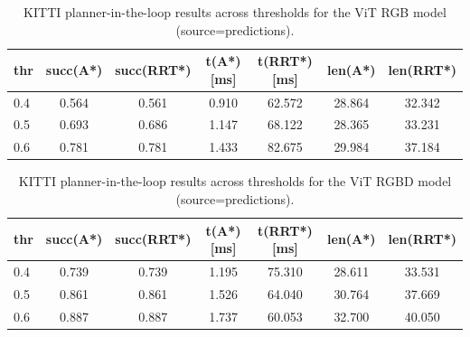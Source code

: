 \begin{table}[H]
  \centering
  \caption{KITTI planner-in-the-loop results across thresholds for the ViT RGB model (source=predictions).}
  \label{tab:kitti_planner_pred_vit_rgb}
  \begin{tabular}{lcccccc}
    \toprule
    thr & succ(A*) & succ(RRT*) & t(A*) [ms] & t(RRT*) [ms] & len(A*) & len(RRT*) \\
    \midrule
    0.4 & 0.564 & 0.561 & 0.910 & 62.572 & 28.864 & 32.342 \\
    0.5 & 0.693 & 0.686 & 1.147 & 68.122 & 28.365 & 33.231 \\
    0.6 & 0.781 & 0.781 & 1.433 & 82.675 & 29.984 & 37.184 \\
    \bottomrule
  \end{tabular}
\end{table}

\begin{table}[H]
  \centering
  \caption{KITTI planner-in-the-loop results across thresholds for the ViT RGBD model (source=predictions).}
  \label{tab:kitti_planner_pred_vit_rgbd}
  \begin{tabular}{lcccccc}
    \toprule
    thr & succ(A*) & succ(RRT*) & t(A*) [ms] & t(RRT*) [ms] & len(A*) & len(RRT*) \\
    \midrule
    0.4 & 0.739 & 0.739 & 1.195 & 75.310 & 28.611 & 33.531 \\
    0.5 & 0.861 & 0.861 & 1.526 & 64.040 & 30.764 & 37.669 \\
    0.6 & 0.887 & 0.887 & 1.737 & 60.053 & 32.700 & 40.050 \\
    \bottomrule
  \end{tabular}
\end{table}
